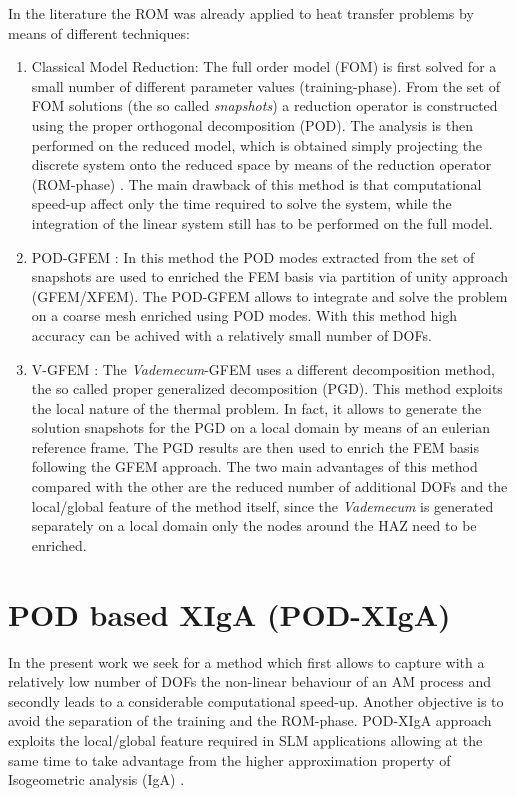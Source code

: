 \documentclass[3p]{article}
\begin{document}
In the literature the ROM was already applied to heat transfer problems by means of different techniques:
\begin{enumerate}
\item Classical Model Reduction: The full order model (FOM) is first solved for a small number of different parameter values (training-phase). From the set of FOM solutions (the so called \textit{snapshots}) a reduction operator is constructed using the proper orthogonal decomposition (POD). The analysis is then performed on the reduced model, which is obtained simply projecting the discrete system onto the reduced space by means of the reduction operator (ROM-phase) \cite{Michopoulos2014a}.
The main drawback of this method is that computational speed-up affect only the time required to solve the system, while the integration of the linear system still has to be performed on the full model.
\item {POD-GFEM} \cite{Aquino2008}: In this method the POD modes extracted from the set of snapshots are used to enriched the FEM basis via partition of unity \cite{Babuska1997} approach (GFEM/XFEM). The POD-GFEM allows to integrate and solve the problem on a coarse mesh enriched using POD modes. With this method high accuracy can be achived with a relatively small number of DOFs.
\item {V-GFEM} \cite{Canales2016a}: The \textit{Vademecum}-GFEM uses a different decomposition method, the so called proper generalized decomposition (PGD). This method exploits the local nature of the thermal problem. In fact, it allows to generate the solution snapshots for the PGD on a local domain by means of an eulerian reference frame. The PGD results are then used to enrich the FEM basis following the GFEM approach. The two main advantages of this method compared with the other are the reduced number of additional DOFs and the local/global feature of the method itself, since the \textit{Vademecum} is generated separately on a local domain only the nodes around the HAZ need to be enriched.
\end{enumerate}


\section*{POD based XIgA (POD-XIgA)}

\indent In the present work we seek for a method which first allows to capture with a relatively low number of DOFs the non-linear behaviour of an AM process and secondly leads to a considerable computational speed-up. Another objective is to avoid the separation of the training and the ROM-phase. POD-XIgA approach exploits the local/global feature required in SLM applications allowing at the same time to take advantage from the higher approximation property of Isogeometric analysis (IgA) \cite{cottrell_isogeometric_2009, nguyen_isogeometric_2013}.
\end{document}
